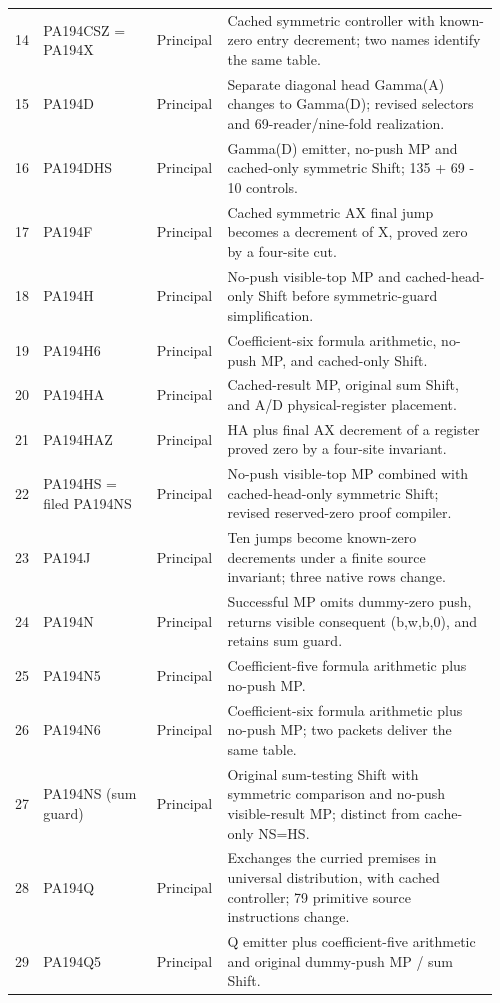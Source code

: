 \begin{longtable}{@{}p{0.035\linewidth}p{0.235\linewidth}p{0.135\linewidth}p{0.55\linewidth}@{}}
14 & PA194CSZ = PA194X & Principal & Cached symmetric controller with known-zero entry decrement; two names identify the same table.\\[4pt]
15 & PA194D & Principal & Separate diagonal head Gamma(A) changes to Gamma(D); revised selectors and 69-reader/nine-fold realization.\\[4pt]
16 & PA194DHS & Principal & Gamma(D) emitter, no-push MP and cached-only symmetric Shift; 135 + 69 - 10 controls.\\[4pt]
17 & PA194F & Principal & Cached symmetric AX final jump becomes a decrement of X, proved zero by a four-site cut.\\[4pt]
18 & PA194H & Principal & No-push visible-top MP and cached-head-only Shift before symmetric-guard simplification.\\[4pt]
19 & PA194H6 & Principal & Coefficient-six formula arithmetic, no-push MP, and cached-only Shift.\\[4pt]
20 & PA194HA & Principal & Cached-result MP, original sum Shift, and A/D physical-register placement.\\[4pt]
21 & PA194HAZ & Principal & HA plus final AX decrement of a register proved zero by a four-site invariant.\\[4pt]
22 & PA194HS = filed PA194NS & Principal & No-push visible-top MP combined with cached-head-only symmetric Shift; revised reserved-zero proof compiler.\\[4pt]
23 & PA194J & Principal & Ten jumps become known-zero decrements under a finite source invariant; three native rows change.\\[4pt]
24 & PA194N & Principal & Successful MP omits dummy-zero push, returns visible consequent (b,w,b,0), and retains sum guard.\\[4pt]
25 & PA194N5 & Principal & Coefficient-five formula arithmetic plus no-push MP.\\[4pt]
26 & PA194N6 & Principal & Coefficient-six formula arithmetic plus no-push MP; two packets deliver the same table.\\[4pt]
27 & PA194NS (sum guard) & Principal & Original sum-testing Shift with symmetric comparison and no-push visible-result MP; distinct from cache-only NS=HS.\\[4pt]
28 & PA194Q & Principal & Exchanges the curried premises in universal distribution, with cached controller; 79 primitive source instructions change.\\[4pt]
29 & PA194Q5 & Principal & Q emitter plus coefficient-five arithmetic and original dummy-push MP / sum Shift.\\[4pt]

\end{longtable}

